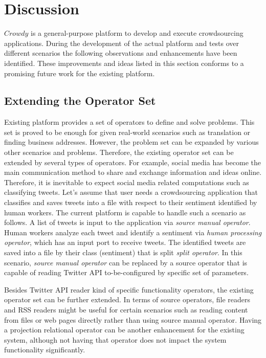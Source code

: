 \chapter{Discussion}
\label{chap:discussion}

$Crowdy$ is a general-purpose platform to develop and execute crowdsourcing applications. During the development of the actual platform and tests over different scenarios the following observations and enhancements have been identified. These improvements and ideas listed in this section conforms to a promising future work for the existing platform. 

\section{Extending the Operator Set}
Existing platform provides a set of operators to define and solve problems. This set is proved to be enough for given real-world scenarios such as translation or finding business addresses. However, the problem set can be expanded by various other scenarios and problems. Therefore, the existing operator set can be extended by several types of operators. For example, social media has become the main communication method to share and exchange information and ideas online. Therefore, it is inevitable to expect social media related computations such as classifying tweets. Let's assume that user needs a crowdsourcing application that classifies and saves tweets into a file with respect to their sentiment identified by human workers. The current platform is capable to handle such a scenario as follows. A list of tweets is input to the application via \textit{source manual operator}. Human workers analyze each tweet and identify a sentiment via \textit{human processing operator}, which has an input port to receive tweets. The identified tweets are saved into a file by their class (sentiment) that is split \textit{split operator}. In this scenario, \textit{source manual operator} can be replaced by a source operator that is capable of reading Twitter API to-be-configured by specific set of parameters.

Besides Twitter API reader kind of specific functionality operators, the existing operator set can be further extended. In terms of source operators, file readers and RSS readers might be useful for certain scenarios such as reading content from files or web pages directly rather than using source manual operator. Having a projection relational operator can be another enhancement for the existing system, although not having that operator does not impact the system functionality significantly.

